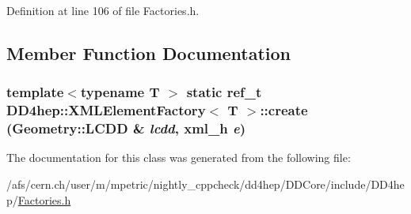 Definition at line 106 of file Factories.h.

\subsection{Member Function Documentation}
\hypertarget{class_d_d4hep_1_1_x_m_l_element_factory_ae05e7a1e9fad323da9527efc778a9cd4}{
\subsubsection[{create}]{\setlength{\rightskip}{0pt plus 5cm}template$<$typename T $>$ static {\bf ref\_\-t} {\bf DD4hep::XMLElementFactory}$<$ {\bf T} $>$::create ({\bf Geometry::LCDD} \& {\em lcdd}, \/  {\bf xml\_\-h} {\em e})}}
\label{class_d_d4hep_1_1_x_m_l_element_factory_ae05e7a1e9fad323da9527efc778a9cd4}


The documentation for this class was generated from the following file:\begin{DoxyCompactItemize}
\item 
/afs/cern.ch/user/m/mpetric/nightly\_\-cppcheck/dd4hep/DDCore/include/DD4hep/\hyperlink{_d_d_core_2include_2_d_d4hep_2_factories_8h}{Factories.h}\end{DoxyCompactItemize}
